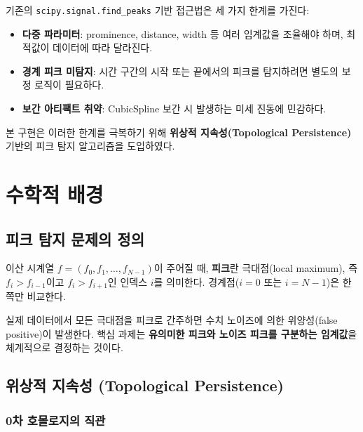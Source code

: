 \documentclass[11pt]{article}
\begin{document}
기존의 \texttt{scipy.signal.find\_peaks} 기반 접근법은 세 가지 한계를 가진다:
\begin{itemize}[nosep]
\item \textbf{다중 파라미터}: prominence, distance, width 등 여러 임계값을 조율해야 하며, 최적값이 데이터에 따라 달라진다.
\item \textbf{경계 피크 미탐지}: 시간 구간의 시작 또는 끝에서의 피크를 탐지하려면 별도의 보정 로직이 필요하다.
\item \textbf{보간 아티팩트 취약}: CubicSpline 보간 시 발생하는 미세 진동에 민감하다.
\end{itemize}

본 구현은 이러한 한계를 극복하기 위해 \textbf{위상적 지속성(Topological Persistence)} 기반의 피크 탐지 알고리즘을 도입하였다.


\section{수학적 배경}

\subsection{피크 탐지 문제의 정의}

이산 시계열 $f = (f_0, f_1, \ldots, f_{N-1})$이 주어질 때, \textbf{피크}란 극대점(local maximum), 즉 $f_i > f_{i-1}$이고 $f_i > f_{i+1}$인 인덱스 $i$를 의미한다.
경계점($i = 0$ 또는 $i = N-1$)은 한쪽만 비교한다.

실제 데이터에서 모든 극대점을 피크로 간주하면 수치 노이즈에 의한 위양성(false positive)이 발생한다.
핵심 과제는 \textbf{유의미한 피크와 노이즈 피크를 구분하는 임계값}을 체계적으로 결정하는 것이다.

\subsection{위상적 지속성 (Topological Persistence)}

\subsubsection{0차 호몰로지의 직관}
\end{document}
